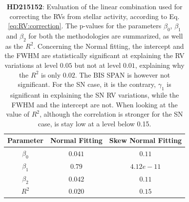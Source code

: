 \documentclass[11pt, oneside]{article}
\begin{document}
\begin{table}[!t]
\begin{tabular}{|c|c|c|}
\hline
Parameter          & Normal Fitting         &   Skew Normal Fitting \\
\hline
$\beta_{0}$            &    $0.041$    & $0.11$ \\
\hline
$\beta_{1}$            &    $0.79$    & $4.12e-11$ \\
\hline
$\beta_{2}$            &     $0.042$   &  $0.11$ \\
\hline
$R^{2}$      &     $0.020$    &  $0.15$   \\
\hline
\end{tabular}
\caption{\textbf{HD215152}: Evaluation of the linear combination used for correcting the RVs from stellar activity, according to Eq. \ref{eq:RV:correction}. The p-values for the parameters $\beta_{0}$, $\beta_{1}$ and $\beta_{2}$ for both the methodologies are summarized, as well as the $R^2$. Concerning the Normal fitting, the intercept and the FWHM are statistically significant at explaining the RV variations at level $0.05$ but not at level $0.01$, explaining why the $R^{2}$ is only $0.02$. The BIS SPAN is however not significant. For the SN case, it is the contrary, $\gamma_1$ is significant in explaining the SN RV variations, while the FWHM and the intercept are not. When looking at the value of 
$R^2$, although the correlation is stronger for the SN case, is stay low at a level below 0.15.}
\label{table:HD215152:test}
\end{table}
\end{document}
